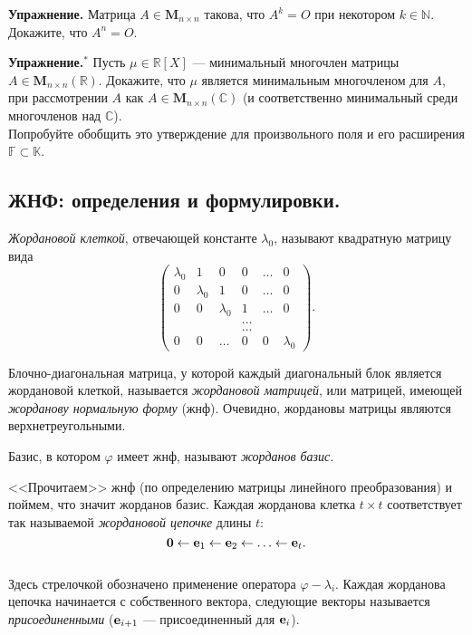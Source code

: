 \otstup


{\bf Упражнение.} %
Матрица $A\in \mathbf{M}_{n\times n}$ такова, что $A^k=O$ при некотором $k\in \mathbb{N}$.  
Докажите, что $A^n=O$.

\otstup


{\bf Упражнение.}$^*$ %
Пусть $\mu \in \mathbb{R}[X]$ --- минимальный многочлен матрицы 
$A\in \mathbf{M}_{n\times n}(\mathbb{R})$. Докажите, что $\mu$ является минимальным 
многочленом для $A$, при рассмотрении $A$ как $A\in \mathbf{M}_{n\times n}(\mathbb{C})$
(и соответственно минимальный среди многочленов над $\mathbb{C}$).\\
Попробуйте обобщить это утверждение для произвольного поля и его расширения 
$\mathbb{F}\subset \mathbb{K}$.



\subsection{ЖНФ: определения и формулировки.}



{\it Жордановой клеткой}, отвечающей константе $\lambda_0$, называют квадратную  матрицу вида
$$\begin{pmatrix} \lambda_0 & 1 & 0 &  0 & \ldots & 0 \\ 
0& \lambda_0 & 1 & 0  & \ldots & 0 \\
0& 0& \lambda_0 & 1 &  \ldots & 0 \\
& & &\ldots  & &\\
& & &\ldots  & &\\
0& 0& \ldots & 0 & 0 &\lambda_0 
\end{pmatrix}.$$

Блочно-диагональная матрица, у которой каждый диагональный блок является жордановой клеткой, называется {\it жордановой матрицей}, или матрицей, имеющей {\it жорданову нормальную форму} (жнф).
Очевидно, жордановы матрицы являются верхнетреугольными.

Базис, в котором $\varphi$ имеет жнф,  называют {\it жорданов базис}.


<<Прочитаем>> жнф (по определению матрицы линейного преобразования) и поймем, что значит жорданов базис.
Каждая жорданова клетка $t\times t$ соответствует так называемой {\it жордановой цепочке} длины $t$: 
$$ \mathbf{0} \leftarrow \mathbf{e}_1 \leftarrow \mathbf{e}_2 \leftarrow \ldots \leftarrow \mathbf{e}_t. $$\\
Здесь стрелочкой обозначено применение оператора $\varphi - \lambda_i$.
Каждая жорданова цепочка начинается с собственного вектора, следующие векторы называется
{\it присоединенными} ($\mathbf{e}_{i+1}$ --- присоединенный для $\mathbf{e}_i$).

